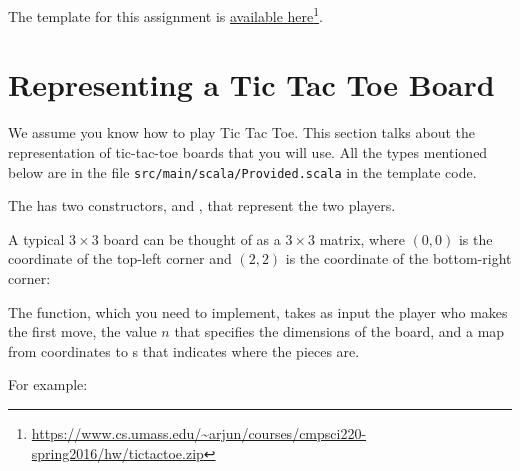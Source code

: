 \documentclass{book}
\begin{document}
The template for this assignment is
\href{https://www.cs.umass.edu/~arjun/courses/cmpsci220-spring2016/hw/tictactoe.zip}{available here}\footnote{\url{https://www.cs.umass.edu/~arjun/courses/cmpsci220-spring2016/hw/tictactoe.zip}}.


\section{Representing a Tic Tac Toe Board}

We assume you know how to play Tic Tac Toe. This section talks about
the representation of tic-tac-toe boards that you will use. All
the types mentioned below are in the file \texttt{src/main/scala/Provided.scala}
in the template code.

The  has two constructors,
 and , that represent the
two players.

A typical $3 \times 3$ board can be thought of as a $3 \times 3$ matrix,
where $(0, 0)$ is
the coordinate of the top-left corner and $(2,2)$ is the coordinate of
the bottom-right corner:


The  function, which you need to implement,
takes as input the player who makes the first move, the
value $n$ that specifies the dimensions of the board, and a map from coordinates to s
that indicates where the pieces are.

For example:
\end{document}
